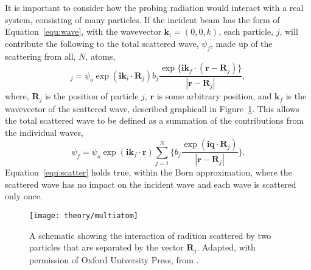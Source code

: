 It is important to consider how the probing radiation would interact with a real system, consisting of many particles.
If the incident beam has the form of Equation~\ref{equ:wave}, with the wavevector $\mathbf{k}_i = (0, 0, k)$, each particle, $j$, will contribute the following to the total scattered wave, $\psi_f$, made up of the scattering from all, $N$, atoms,
%
\begin{equation}
    [\delta\psi_f]_j = \psi_o\exp{(\mathbf{ik}_i\cdot \mathbf{R}_j)}b_j\frac{\exp{\big\{\mathbf{ik}_f\cdot (\mathbf{r}-\mathbf{R}_j)\big\}}}{|\mathbf{r}-\mathbf{R}_j|},
\end{equation}
%
where, $\mathbf{R}_j$ is the position of particle $j$, $\mathbf{r}$ is some arbitrary position, and $\mathbf{k}_f$ is the wavevector of the scattered wave, described graphicall in Figure~\ref{fig:multiatom}.
This allows the total scattered wave to be defined as a summation of the contributions from the individual waves,
%
\begin{equation}
    \psi_f = \psi_o \exp{(\mathbf{ik}_f\cdot\mathbf{r})}\sum_{j=1}^{N}\bigg\{b_j \frac{\exp{(\mathbf{iq}\cdot \mathbf{R}_j)}}{|\mathbf{r}-\mathbf{R}_j|}\bigg\}.
    \label{equ:scatter}
\end{equation}
%
Equation~\ref{equ:scatter} holds true, within the Born approximation, where the scattered wave has no impact on the incident wave and each wave is scattered only once.
%
\begin{figure}
    \centering
    \texttt{[image: theory/multiatom]}
    \caption{A schematic showing the interaction of radition scattered by two particles that are separated by the vector $\mathbf{R}_j$. Adapted, with permission of Oxford University Press, from \cite{sivia_elementary_2011}.}
    \label{fig:multiatom}
\end{figure}
%

